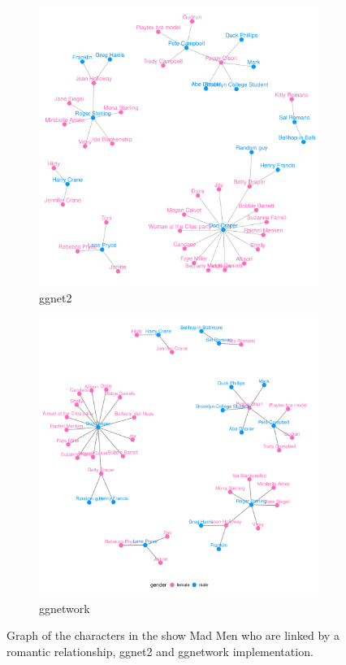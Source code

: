\begin{figure}[hbtp]
\begin{subfigure}[t]{.495\textwidth}
\caption{ggnet2}
\includegraphics[width=\textwidth]{figure/madmen_ggnet2-1.pdf}
\end{subfigure}
\begin{subfigure}[t]{.495\textwidth}
\caption{ggnetwork}
\includegraphics[width=\textwidth]{figure/madmen_ggnetwork-1.pdf}
\end{subfigure}

\caption{\label{fig:madmen-2} Graph of the characters in the show Mad Men who are linked by a romantic relationship, ggnet2 and ggnetwork implementation.}
\end{figure}

